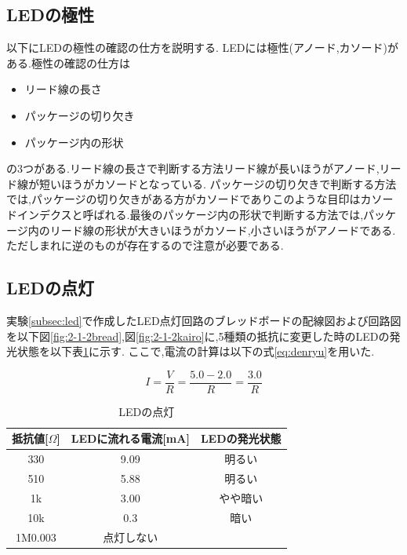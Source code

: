 \documentclass{jarticle}
\begin{document}
\subsection{LEDの極性}
以下にLEDの極性の確認の仕方を説明する.
LEDには極性(アノード,カソード)がある.極性の確認の仕方は

\begin{itemize}

\item リード線の長さ
\item パッケージの切り欠き
\item パッケージ内の形状

\end{itemize}

の3つがある.リード線の長さで判断する方法リード線が長いほうがアノード,リード線が短いほうがカソードとなっている.
パッケージの切り欠きで判断する方法では,パッケージの切り欠きがある方がカソードでありこのような目印はカソードインデクスと呼ばれる.最後のパッケージ内の形状で判断する方法では,パッケージ内のリード線の形状が大きいほうがカソード,小さいほうがアノードである.ただしまれに逆のものが存在するので注意が必要である.

\subsection{LEDの点灯}
実験\ref{subsec:led}で作成したLED点灯回路のブレッドボードの配線図および回路図を以下図\ref{fig:2-1-2bread},図\ref{fig:2-1-2kairo}に,5種類の抵抗に変更した時のLEDの発光状態を以下表\ref{table:led}に示す.
ここで,電流の計算は以下の式\ref{eq:denryu}を用いた.

\begin{equation}
I=\frac{V}{R}=\frac{5.0-2.0}{R}=\frac{3.0}{R}
\label{eq:denryu}
\end{equation}

\begin{table}[H]
\centering
\caption{LEDの点灯}
\label{table:led}
\begin{center}
\begin{tabular}{c|c|c}
\hline \hline
抵抗値[$\Omega$] &LEDに流れる電流[mA] &LEDの発光状態\\ \hline
330&9.09&明るい\\
510&5.88&明るい\\
1k&3.00&やや暗い\\
10k&0.3&暗い\\
1M0.003&点灯しない\\ \hline
\end{tabular}
\end{center}
\end{table}
\end{document}
